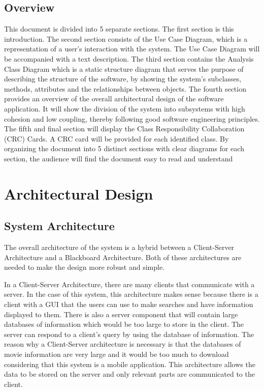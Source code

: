 \documentclass[]{article}
\begin{document}
\subsection{Overview}
\label{sub:overview}
This document is divided into 5 separate sections. The first section is this introduction. The second section consists of the Use Case Diagram, which is a representation of a user’s interaction with the system. The Use Case Diagram will be accompanied with a text description. The third section contains the Analysis Class Diagram which is a static structure diagram that serves the purpose of describing the structure of the software, by showing the system’s subclasses, methods, attributes and the relationships between objects. The fourth section provides an overview of the overall architectural design of the software application. It will show the division of the system into subsystems with high cohesion and low coupling, thereby following good software engineering principles. 
The fifth and final section will display the Class Responsibility Collaboration (CRC) Cards. A CRC card will be provided for each identified class. By organizing the document into 5 distinct sections with clear diagrams for each section, the audience will find the document easy to read and understand




\section{Architectural Design}
\label{sec:architectural_design}

\subsection{System Architecture}
\label{sub:system_architecture}
The overall architecture of the system is a hybrid between a Client-Server Architecture and a Blackboard Architecture. Both of these architectures are needed to make the design more robust and simple.

In a Client-Server Architecture, there are many clients that communicate with a server. In the case of this system, this architecture makes sense because there is a client with a GUI that the users can use to make searches and have information displayed to them. There is also a server component that will contain large databases of information which would be too large to store in the client. The server can respond to a client's query by using the database of information. The reason why a Client-Server architecture is necessary is that the databases of movie information are very large and it would be too much to download considering that this system is a mobile application. This architecture allows the data to be stored on the server and only relevant parts are communicated to the client.
\end{document}
